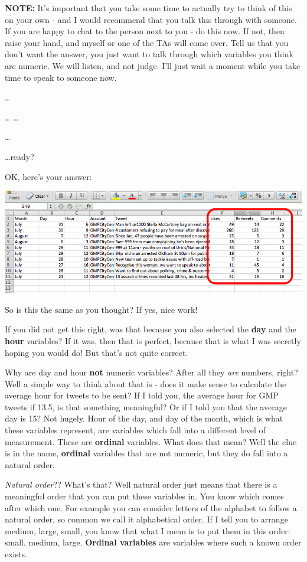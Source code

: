 \documentclass[]{book}
\theoremstyle{definition}
\theoremstyle{definition}
\theoremstyle{definition}
\theoremstyle{remark}
\begin{document}
\textbf{NOTE:} It's important that you take some time to actually try to
think of this on your own - and I would recommend that you talk this
through with someone. If you are happy to chat to the person next to you
- do this now. If not, then raise your hand, and myself or one of the
TAs will come over. Tell us that you don't want the answer, you just
want to talk through which variables you think are numeric. We will
listen, and not judge. I'll just wait a moment while you take time to
speak to someone now.

\ldots{}

\ldots{} \ldots{}

\ldots{}

\ldots{}ready?

OK, here's your answer:

\includegraphics{imgs/num_vars.png}

So is this the same as you thought? If yes, nice work!

If you did not get this right, was that because you also selected the
\textbf{day} and the \textbf{hour} variables? If it was, then that is
perfect, because that is what I was secretly hoping you would do! But
that's not quite correct.

Why are day and hour \textbf{not} numeric variables? After all they
\emph{are} numbers, right? Well a simple way to think about that is -
does it make sense to calculate the average hour for tweets to be sent?
If I told you, the average hour for GMP tweets if 13.5, is that
something meaningful? Or if I told you that the average day is 15? Not
hugely. Hour of the day, and day of the month, which is what these
variables represent, are variables which fall into a different level of
measurement. These are \textbf{ordinal} variables. What does that mean?
Well the clue is in the name, \textbf{ordinal} variables that are not
numeric, but they do fall into a natural order.

\emph{Natural order}?? What's that? Well natural order just means that
there is a meaningful order that you can put these variables in. You
know which comes after which one. For example you can consider letters
of the alphabet to follow a natural order, so common we call it
alphabetical order. If I tell you to arrange medium, large, small, you
know that what I mean is to put them in this order: small, medium,
large. \textbf{Ordinal variables} are variables where such a known order
exists.
\end{document}
